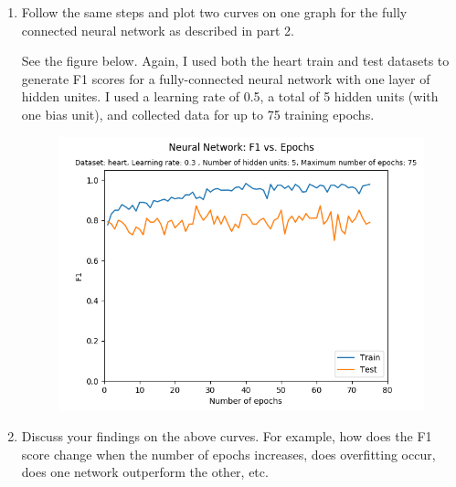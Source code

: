 \documentclass{article}
\newenvironment{soln}{
	\leavevmode\color{blue}\ignorespaces
}{}
\begin{document}
\begin{enumerate}
\pagebreak
\item Follow the same steps and plot two curves on one graph for the fully connected neural network as described in part 2.

\begin{soln}
See the figure below. Again, I used both the heart train and test datasets to generate F1 scores for a fully-connected neural network with one layer of hidden unites. I used a learning rate of 0.5, a total of 5 hidden units (with one bias unit), and collected data for up to 75 training epochs.

\begin{figure}[h]
\centering
\includegraphics[scale=1]{figs/nnet_f1_curve}
\end{figure}
\end{soln}

\pagebreak
\item Discuss your findings on the above curves. For example, how does the F1 score change when the number of epochs increases, does overfitting occur, does one network outperform the other, etc.


\end{enumerate}
\end{document}

